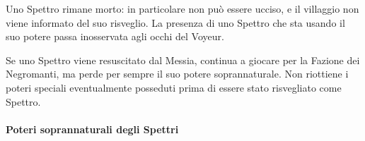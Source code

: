 \documentclass[a4paper,10pt]{article}
\begin{document}
\begin{itemize}
 Uno Spettro rimane morto: in particolare non può essere ucciso, e il villaggio
non viene informato del suo risveglio.
 La presenza di uno Spettro che sta usando il suo potere passa inosservata agli
occhi del Voyeur.
 
 Se uno Spettro viene resuscitato dal Messia, continua a giocare per la Fazione
dei Negromanti, ma perde per sempre il suo potere soprannaturale. 
Non riottiene i poteri speciali eventualmente
posseduti prima di essere stato risvegliato come Spettro.
 
\end{itemize}


\paragraph{Poteri soprannaturali degli Spettri}
\end{document}
